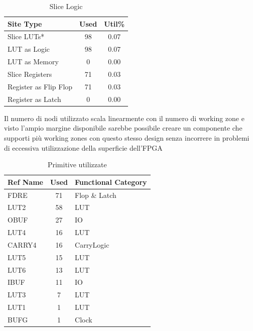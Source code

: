 \documentclass[a4paper]{article}
\begin{document}
\hspace{8em}
\begin{table}[H]
  \centering
  \begin{tabular}{|p{3.5cm}|c|c|}
    \hline
    \bf{Site Type}        & \bf{Used} & \bf{Util\%} \\
    \hline
    Slice LUTs*           & 98        & 0.07        \\
    \hline
    LUT as Logic          & 98        & 0.07        \\
    \hline
    LUT as Memory         & 0         & 0.00        \\
    \hline
    Slice Registers       & 71        & 0.03        \\
    \hline
    Register as Flip Flop & 71        & 0.03        \\
    \hline
    Register as Latch     & 0         & 0.00        \\
    \hline
  \end{tabular}
  \caption{Slice Logic}
\end{table}

\hspace{8em}

Il numero di nodi utilizzato scala linearmente con il numero di working zone e visto l'ampio margine disponibile sarebbe possibile creare un componente che supporti più working zones con questo stesso design senza incorrere in problemi di eccessiva utilizzazione della superficie dell'FPGA

\hspace{8em}
\begin{table}[H]
  \centering
  \begin{tabular}{|p{2cm}|c|p{3.70cm}|}
    \hline
    \bf{Ref Name} & \bf{Used} & \bf{Functional Category} \\
    \hline
    FDRE          & 71        & Flop \& Latch            \\
    \hline
    LUT2          & 58        & LUT                      \\
    \hline
    OBUF          & 27        & IO                       \\
    \hline
    LUT4          & 16        & LUT                      \\
    \hline
    CARRY4        & 16        & CarryLogic               \\
    \hline
    LUT5          & 15        & LUT                      \\
    \hline
    LUT6          & 13        & LUT                      \\
    \hline
    IBUF          & 11        & IO                       \\
    \hline
    LUT3          & 7         & LUT                      \\
    \hline
    LUT1          & 1         & LUT                      \\
    \hline
    BUFG          & 1         & Clock                    \\
    \hline
  \end{tabular}
  \caption{Primitive utilizzate}
\end{table}
\end{document}
